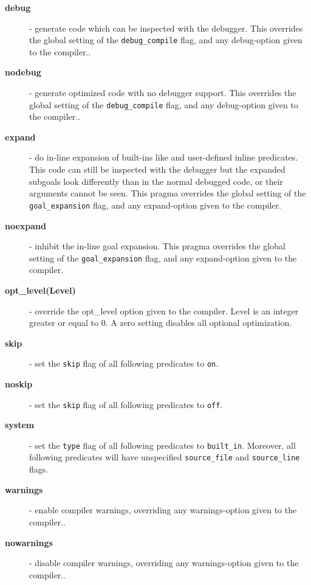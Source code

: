 \begin{description}
\item[{\bf debug}] - generate code which can be inspected with the
debugger.
This overrides the global setting of the {\tt debug_compile} flag,
and any debug-option given to the compiler..

\item[{\bf nodebug}] - generate optimized code with no debugger support.
This overrides the global setting of the {\tt debug_compile} flag,
and any debug-option given to the compiler..

\item[{\bf expand}] - do in-line expansion of built-ins 
like  and user-defined
inline predicates.
This code can still be inspected with the debugger but the expanded
subgoals look differently than in the normal debugged code,
or their arguments cannot be seen.
This pragma overrides the global setting of the {\tt goal_expansion} flag,
and any expand-option given to the compiler.

\item[{\bf noexpand}] - inhibit the in-line goal expansion.
This pragma overrides the global setting of the {\tt goal_expansion} flag,
and any expand-option given to the compiler.

\item[{\bf opt_level(Level)}] - override the opt_level option given to the
compiler. Level is an integer greater or equal to 0.  A zero setting disables
all optional optimization.

\item[{\bf skip}] - set the {\tt skip} flag of all following
predicates to {\tt on}.

\item[{\bf noskip}] - set the {\tt skip} flag of all following
predicates to {\tt off}.

\item[{\bf system}] - set the {\tt type} flag of all following
predicates to {\tt built_in}.
Moreover, all following predicates will have unspecified
{\tt source_file} and {\tt source_line} flags.

\item[{\bf warnings}] - enable compiler warnings, overriding any
warnings-option given to the compiler..

\item[{\bf nowarnings}] - disable compiler warnings, overriding any
warnings-option given to the compiler..

\end{description}

